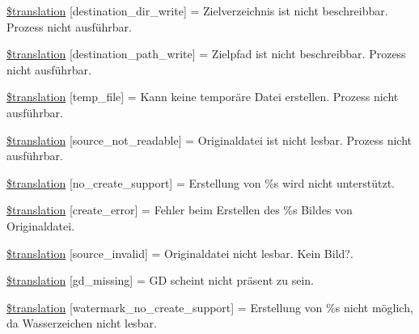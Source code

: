 \begin{DoxyCompactItemize}
\item 
\hyperlink{class_8upload_8de___d_e_8php_a97608ea194a616db49141a0e6dee900c}{\$translation} \mbox{[}\textquotesingle{}destination\+\_\+dir\+\_\+write\textquotesingle{}\mbox{]} = \textquotesingle{}Zielverzeichnis ist nicht beschreibbar. Prozess nicht ausführbar.\textquotesingle{}
\item 
\hyperlink{class_8upload_8de___d_e_8php_a40e4e1962226b89fd76da5819a9602b0}{\$translation} \mbox{[}\textquotesingle{}destination\+\_\+path\+\_\+write\textquotesingle{}\mbox{]} = \textquotesingle{}Zielpfad ist nicht beschreibbar. Prozess nicht ausführbar.\textquotesingle{}
\item 
\hyperlink{class_8upload_8de___d_e_8php_a2baece8da11e20d45175db91851ec3e3}{\$translation} \mbox{[}\textquotesingle{}temp\+\_\+file\textquotesingle{}\mbox{]} = \textquotesingle{}Kann keine temporäre Datei erstellen. Prozess nicht ausführbar.\textquotesingle{}
\item 
\hyperlink{class_8upload_8de___d_e_8php_a922967ca2df0efdd455261142d8e5715}{\$translation} \mbox{[}\textquotesingle{}source\+\_\+not\+\_\+readable\textquotesingle{}\mbox{]} = \textquotesingle{}Originaldatei ist nicht lesbar. Prozess nicht ausführbar.\textquotesingle{}
\item 
\hyperlink{class_8upload_8de___d_e_8php_a346dfd1ade29f583dd20d345c436859f}{\$translation} \mbox{[}\textquotesingle{}no\+\_\+create\+\_\+support\textquotesingle{}\mbox{]} = \textquotesingle{}Erstellung von \%s wird nicht unterstützt.\textquotesingle{}
\item 
\hyperlink{class_8upload_8de___d_e_8php_a53013ce9255c4e1849098ddd9fdb2b3f}{\$translation} \mbox{[}\textquotesingle{}create\+\_\+error\textquotesingle{}\mbox{]} = \textquotesingle{}Fehler beim Erstellen des \%s Bildes von Originaldatei.\textquotesingle{}
\item 
\hyperlink{class_8upload_8de___d_e_8php_a6ab0a660b457eaf2d3434b225449fdd6}{\$translation} \mbox{[}\textquotesingle{}source\+\_\+invalid\textquotesingle{}\mbox{]} = \textquotesingle{}Originaldatei nicht lesbar. Kein Bild?.\textquotesingle{}
\item 
\hyperlink{class_8upload_8de___d_e_8php_a7f3dfcc0db4bbc0f2e7210c439798e56}{\$translation} \mbox{[}\textquotesingle{}gd\+\_\+missing\textquotesingle{}\mbox{]} = \textquotesingle{}G\+D scheint nicht präsent zu sein.\textquotesingle{}
\item 
\hyperlink{class_8upload_8de___d_e_8php_a82d5853430ab72dc1f9799ec36144cc6}{\$translation} \mbox{[}\textquotesingle{}watermark\+\_\+no\+\_\+create\+\_\+support\textquotesingle{}\mbox{]} = \textquotesingle{}Erstellung von \%s nicht möglich, da Wasserzeichen nicht lesbar.\textquotesingle{}

\end{DoxyCompactItemize}
